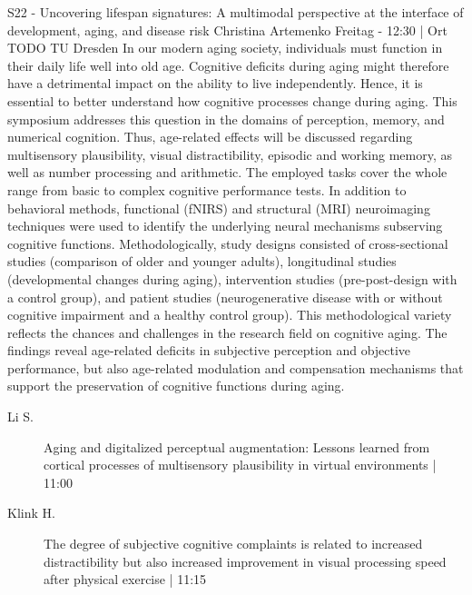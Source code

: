 
            \begin{symposium}
            {S22 - Uncovering lifespan signatures: A multimodal perspective at the interface of development, aging, and disease risk }
            {Christina Artemenko}
            {Freitag  - 12:30 | Ort TODO}
            {TU Dresden}
            In our modern aging society, individuals must function in their daily life well into old age. Cognitive deficits during aging might therefore have a detrimental impact on the ability to live independently. Hence, it is essential to better understand how cognitive processes change during aging.
This symposium addresses this question in the domains of perception, memory, and numerical cognition. Thus, age-related effects will be discussed regarding multisensory plausibility, visual distractibility, episodic and working memory, as well as number processing and arithmetic. The employed tasks cover the whole range from basic to complex cognitive performance tests.
In addition to behavioral methods, functional (fNIRS) and structural (MRI) neuroimaging techniques were used to identify the underlying neural mechanisms subserving cognitive functions. Methodologically, study designs consisted of cross-sectional studies (comparison of older and younger adults), longitudinal studies (developmental changes during aging), intervention studies (pre-post-design with a control group), and patient studies (neurogenerative disease with or without cognitive impairment and a healthy control group). This methodological variety reflects the chances and challenges in the research field on cognitive aging.
The findings reveal age-related deficits in subjective perception and objective performance, but also age-related modulation and compensation mechanisms that support the preservation of cognitive functions during aging.
            \begin{description}    
            
                \item [ Li S.] Aging and digitalized perceptual augmentation: Lessons learned from cortical processes of multisensory plausibility in virtual environments \textcolor{mygray}{ | 11:00}    
                
                \item [ Klink H.] The degree of subjective cognitive complaints is related to increased distractibility but also increased improvement in visual processing speed after physical exercise \textcolor{mygray}{ | 11:15}    
                

\end{description}
\end{symposium}
